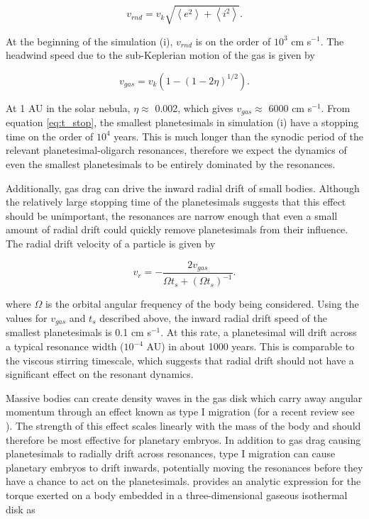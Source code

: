 \begin{equation}\label{eq:vrnd}
    v_{rnd} = v_{k} \sqrt{\left< e^2\right> + \left< i^2\right>}.
\end{equation}

\noindent At the beginning of the simulation (i), $v_{rnd}$ is on the order of $10^3$ cm s$^{-1}$. The headwind speed due to the 
sub-Keplerian motion of the gas is given by \cite{adachi76}

\begin{equation}\label{eq:vgas}
    v_{gas} = v_{k} \left( 1 - (1 - 2 \eta)^{1/2} \right).
\end{equation}

\noindent At 1 AU in the solar nebula, $\eta \approx$ 0.002, which gives $v_{gas} \approx$ 6000 cm s$^{-1}$. From equation 
\ref{eq:t_stop}, the smallest planetesimals in simulation (i) have a stopping time on the order of $10^4$ years. This is much 
longer than the synodic period of the relevant planetesimal-oligarch resonances, therefore we expect the dynamics of even the 
smallest planetesimals to be entirely dominated by the resonances.

Additionally, gas drag can drive the inward radial drift of small bodies. Although the relatively large stopping time of the 
planetesimals suggests that this effect should be unimportant, the resonances are narrow enough that even a small amount of 
radial drift could quickly remove planetesimals from their influence. The radial drift velocity of a particle is given by 
\cite{weidenschilling77}

\begin{equation}\label{eq:v_drift}
    v_{r}  = -\frac{2 v_{gas}}{\Omega t_{s} + \left( \Omega t_{s} \right)^{-1}}.
\end{equation}

\noindent where $\Omega$ is the orbital angular frequency of the body being considered. Using the values for $v_{gas}$ and 
$t_{s}$ described above, the inward radial drift speed of the smallest planetesimals is 0.1 cm s$^{-1}$. At this rate, a 
planetesimal will drift across a typical resonance width ($10^{-4}$ AU) in about 1000 years. This is comparable to the viscous 
stirring timescale, which suggests that radial drift should not have a significant effect on the resonant dynamics.

Massive bodies can create density waves in the gas disk which carry away angular momentum \cite{goldreich79, goldreich80} 
through an effect known as type I migration (for a recent review see \cite{baruteau14}). The strength of this effect scales linearly 
with the mass of the body and should therefore be most effective for planetary embryos. In addition to gas drag causing 
planetesimals to radially drift across resonances, type I migration can cause planetary embryos to drift inwards, potentially 
moving the resonances before they have a chance to act on the planetesimals. \cite{tanaka02} provides an analytic expression 
for the torque exerted on a body embedded in a three-dimensional gaseous isothermal disk as

